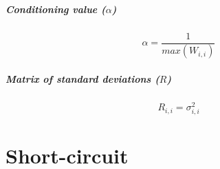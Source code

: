 \documentclass[a4paper,twoside,fleqn]{tufte-book}
\begin{document}
\paragraph{Conditioning value ($\alpha$)}

\begin{equation}
\alpha = \frac{1}{max(W_{i, i})}
\end{equation}


\paragraph{Matrix of standard deviations ($R$)}

\begin{equation}
R_{i, i} = \sigma_{i, i}^2
\end{equation}


\chapter{Short-circuit}





\backmatter





\printindex
\end{document}

